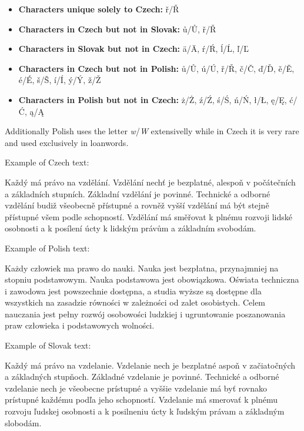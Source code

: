 \documentclass[12pt, oneside]{article}
\begin{document}
\begin{itemize}
  \item \textbf{Characters unique solely to Czech:} ř/Ř
  \item \textbf{Characters in Czech but not in Slovak:} ů/Ů, ř/Ř
  \item \textbf{Characters in Slovak but not in Czech:} ä/Ä, ŕ/Ŕ, ĺ/Ĺ, ľ/Ľ
  \item \textbf{Characters in Czech but not in Polish:} ů/Ů, ú/Ú, ř/Ř, č/Č, ď/Ď, ě/Ě, é/É, š/Š, í/Í, ý/Ý, ž/Ž
  \item \textbf{Characters in Polish but not in Czech:} ż/Ż, ź/Ź, ś/Ś, ń/Ń, ł/Ł, ę/Ę, ć/Ć, ą/Ą
\end{itemize}

Additionally Polish uses the letter \textit{w}/\textit{W} extensivelly while in Czech it is very rare and used exclusively in loanwords.

Example of Czech text:
\begin{center} \begin{roundexBox}
  Každý má právo na vzdělání. Vzdělání nechť je bezplatné, alespoň v počátečních a základních stupních. Základní vzdělání je povinné. Technické a odborné vzdělání budiž všeobecně přístupné a rovněž vyšší vzdělání má být stejně přístupné všem podle schopností. Vzdělání má směřovat k plnému rozvoji lidské osobnosti a k posílení úcty k lidským právům a základním svobodám.
\end{roundexBox} \end{center}

Example of Polish text:
\begin{center} \begin{roundexBox}
  Każdy człowiek ma prawo do nauki. Nauka jest bezpłatna, przynajmniej na stopniu podstawowym. Nauka podstawowa jest obowiązkowa. Oświata techniczna i zawodowa jest powszechnie dostępna, a studia wyższe są dostępne dla wszystkich na zasadzie równości w zależności od zalet osobistych. Celem nauczania jest pełny rozwój osobowości ludzkiej i ugruntowanie poszanowania praw człowieka i podstawowych wolności.
\end{roundexBox} \end{center}

Example of Slovak text:
\begin{center} \begin{roundexBox}
  Každý má právo na vzdelanie. Vzdelanie nech je bezplatné aspoň v začiatočných a základných stupňoch. Základné vzdelanie je povinné. Technické a odborné vzdelanie nech je všeobecne prístupné a vyššie vzdelanie má byť rovnako prístupné každému podľa jeho schopností. Vzdelanie má smerovať k plnému rozvoju ľudskej osobnosti a k posilneniu úcty k ľudským právam a základným slobodám.
\end{roundexBox} \end{center}
\end{document}
